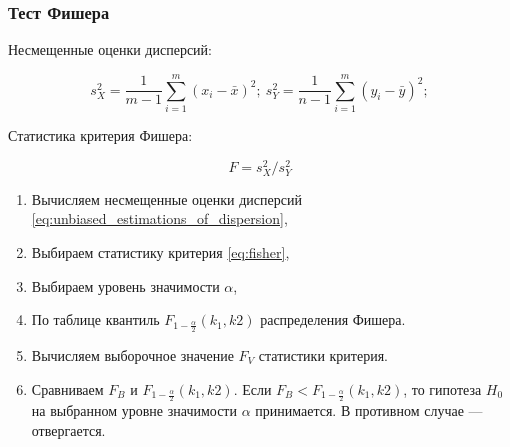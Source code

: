 \documentclass[12pt,a4paper]{article}
\begin{document}
		\subsubsection{Тест Фишера}

		Несмещенные оценки дисперсий:

		\begin{equation} \label{eq:unbiased_estimations_of_dispersion}
			s_X^2 = \frac{1}{m - 1} \sum_{i=1}^m (x_i - \bar x)^2; \
			s_Y^2 = \frac{1}{n - 1} \sum_{i=1}^m (y_i - \bar y)^2;
		\end{equation}

		Статистика критерия Фишера:

		\begin{equation} \label{eq:fisher}
			F = s_X^2 / s_Y^2
		\end{equation}

		\begin{enumerate}
			\item Вычисляем несмещенные оценки дисперсий
				\eqref{eq:unbiased_estimations_of_dispersion},
			\item Выбираем статистику критерия \eqref{eq:fisher},
			\item Выбираем уровень значимости \( \alpha \),
			\item По таблице квантиль \( F_{1 - \frac{\alpha}{2}} (k_1, k2) \)
				распределения Фишера.
			\item Вычисляем выборочное значение \( F_V \) статистики критерия.
			\item Сравниваем \( F_B \) и \( F_{1 - \frac{\alpha}{2}} (k_1, k2) \).
				Если \( F_B < F_{1 - \frac{\alpha}{2}} (k_1, k2) \), то гипотеза
				\( H_0 \) на выбранном уровне значимости \( \alpha \) принимается.
				В противном случае — отвергается.
		\end{enumerate}
\end{document}
